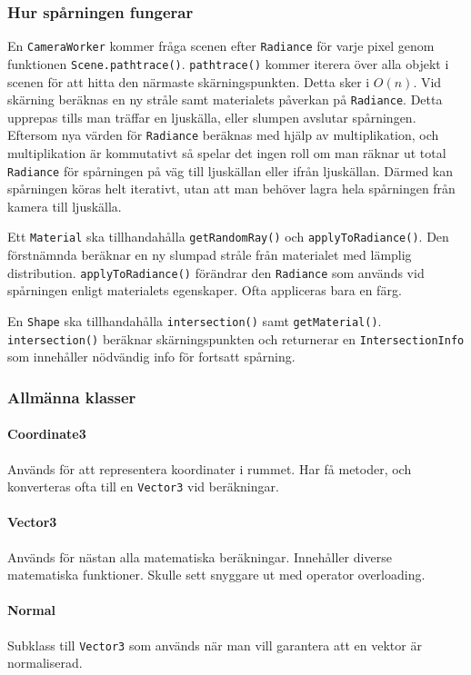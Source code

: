 \documentclass{article}
\begin{document}
\subsubsection{Hur spårningen fungerar}
En \texttt{CameraWorker} kommer fråga scenen efter \texttt{Radiance}
för varje pixel genom funktionen
\texttt{Scene.pathtrace()}. \texttt{pathtrace()} kommer iterera över
alla objekt i scenen för att hitta den närmaste
skärningspunkten. Detta sker i $O(n)$. Vid skärning beräknas en ny
stråle samt materialets påverkan på \texttt{Radiance}. Detta upprepas
tills man träffar en ljuskälla, eller slumpen avslutar spårningen.
Eftersom nya värden för \texttt{Radiance} beräknas med hjälp av
multiplikation, och multiplikation är kommutativt så spelar det ingen
roll om man räknar ut total \texttt{Radiance} för spårningen på väg
till ljuskällan eller ifrån ljuskällan. Därmed kan spårningen köras
helt iterativt, utan att man behöver lagra hela spårningen från kamera
till ljuskälla.

Ett \texttt{Material} ska tillhandahålla \texttt{getRandomRay()} och
\texttt{applyToRadiance()}. Den förstnämnda beräknar en ny slumpad
stråle från materialet med lämplig
distribution. \texttt{applyToRadiance()} förändrar den
\texttt{Radiance} som används vid spårningen enligt materialets
egenskaper. Ofta appliceras bara en färg.

En \texttt{Shape} ska tillhandahålla \texttt{intersection()} samt
\texttt{getMaterial()}. \texttt{intersection()} beräknar
skärningspunkten och returnerar en \texttt{IntersectionInfo} som
innehåller nödvändig info för fortsatt spårning.

\subsubsection{Allmänna klasser}
\paragraph{Coordinate3}
Används för att representera koordinater i rummet. Har få metoder, och
konverteras ofta till en \texttt{Vector3} vid beräkningar.

\paragraph{Vector3}
Används för nästan alla matematiska beräkningar. Innehåller diverse
matematiska funktioner. Skulle sett snyggare ut med operator overloading.

\paragraph{Normal}
Subklass till \texttt{Vector3} som används när man vill garantera att
en vektor är normaliserad.
\end{document}
